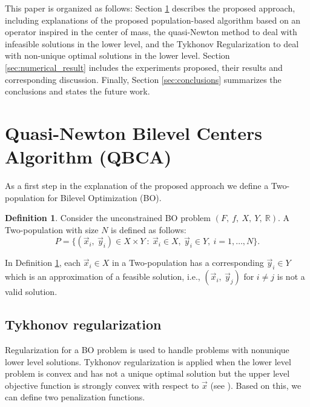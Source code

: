 \documentclass[conference]{IEEEtran}
\theoremstyle{definition}
\newtheorem{definition}{Definition}[section]
\begin{document}
This paper is organized as follows: Section \ref{sec:qca} describes the proposed
approach, including explanations of the proposed population-based algorithm based
on an operator inspired in the center of mass, the quasi-Newton method to deal
with infeasible solutions in the lower level, and the Tykhonov Regularization to
deal with non-unique optimal solutions in the lower level. Section \ref{sec:numerical_result}
includes the experiments proposed, their results and corresponding discussion.
Finally, Section \ref{sec:conclusions} summarizes the conclusions and states
the future work.





\section{Quasi-Newton Bilevel Centers Algorithm (QBCA)} %
\label{sec:qca}

As a first step in the explanation of the proposed approach we define a
Two-population for Bilevel Optimization (BO).

\begin{definition}
    \label{def:pop2}
    Consider the unconstrained BO problem $(F, \ f, \ X, \ Y, \ \mathbb{R} )$. A
    Two-population with size $N$ is defined as follows:
    $$
        P = \{  (\vec{x}_i, \ \vec{y}_i) \in X \times Y \ : \
                \vec{x}_i \in X, \ \vec{y}_i \in Y, \ i=1,\ldots,N
            \}.
    $$     
\end{definition}
 
In Definition \ref{def:pop2}, each $\vec{x}_i \in X$ in a Two-population has a
corresponding $\vec{y}_i \in Y$ which is an approximation of a feasible solution,
i.e., $(\vec{x}_i, \ \vec{y}_j)$ for $i \neq j$ is  not a valid solution.

\subsection{Tykhonov regularization}
Regularization for a BO problem is used to handle problems with nonunique lower
level solutions.  Tykhonov regularization is applied when the lower level problem
is convex and has not a unique optimal solution but the upper level objective function
is strongly convex with respect to $\vec{x}$ (see \cite{dempe2002foundations}).
Based on this, we can define two penalization functions.
\end{document}
